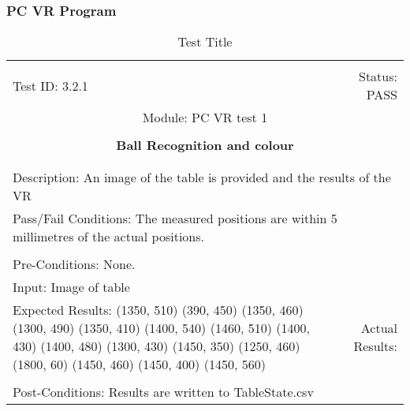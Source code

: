\documentclass[titlepage]{article}
\begin{document}
\subsubsection{PC VR Program}
\begin{center}%
\begin{table}
\begin{tabular}{|l r|}\hline&\\[-2mm]
	Test ID: 3.2.1	&Status: PASS\\[-3mm]
	\multicolumn{2}{|c|}{Module: PC VR test 1}\\&\\
	\multicolumn{2}{|c|}{\textbf{\large{Ball Recognition and colour}}}\\&\\\hline&\\[-3mm]
	\multicolumn{2}{|p{\textwidth}|}{Description: An image of the table is provided and the results of the VR }\\\hline
	\multicolumn{2}{|p{\textwidth}|}{Pass/Fail Conditions: The measured positions are within 5 millimetres of the actual positions.}\\[1mm]\hline&\\[-3mm]
	\multicolumn{2}{|p{\textwidth}|}{Pre-Conditions: None.}\\[4mm]
	\multicolumn{2}{|p{\textwidth}|}{Input: Image of table}\\[2mm]\hline
	\multicolumn{1}{|p{0.49\textwidth}}{Expected Results:\newline
(1350, 510)\newline
(390, 450)\newline
(1350, 460)\newline
(1300, 490)\newline
(1350, 410)\newline
(1400, 540)\newline
(1460, 510)\newline
(1400, 430)\newline
(1400, 480)\newline
(1300, 430)\newline
(1450, 350)\newline
(1250, 460)\newline
(1800, 60)\newline
(1450, 460)\newline
(1450, 400)\newline
(1450, 560)\newline}	&\multicolumn{1}{|p{0.45\textwidth}|}{Actual Results: }\\\hline&\\[-3mm]
	\multicolumn{2}{|p{\textwidth}|}{Post-Conditions: Results are written to TableState.csv}\\\hline
\end{tabular}
\caption{Test Title}
\end{table}
\end{center}
\end{document}
